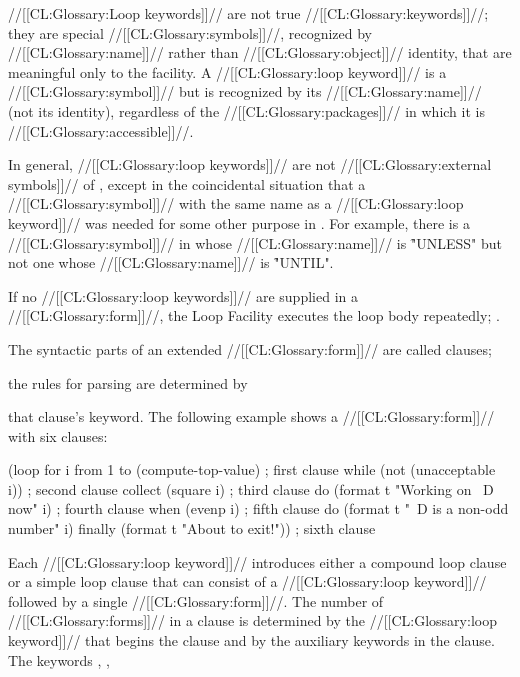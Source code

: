\endsubsubsubsection%

\endsubsubsection%



//[[CL:Glossary:Loop keywords]]// are not true //[[CL:Glossary:keywords]]//; 
they are special //[[CL:Glossary:symbols]]//, recognized by //[[CL:Glossary:name]]// rather than //[[CL:Glossary:object]]// identity,
that are meaningful only to the  facility.
A //[[CL:Glossary:loop keyword]]// is a //[[CL:Glossary:symbol]]// but is recognized by its //[[CL:Glossary:name]]//
(not its identity), regardless of the //[[CL:Glossary:packages]]// in which it is //[[CL:Glossary:accessible]]//.  

In general, //[[CL:Glossary:loop keywords]]// are not //[[CL:Glossary:external symbols]]// of ,
except in the coincidental situation that a //[[CL:Glossary:symbol]]// with the same name as a
//[[CL:Glossary:loop keyword]]// was needed for some other purpose in \clisp.  For example,
there is a //[[CL:Glossary:symbol]]// in  whose //[[CL:Glossary:name]]// is \f{"UNLESS"} but
not one whose //[[CL:Glossary:name]]// is \f{"UNTIL"}.


If no //[[CL:Glossary:loop keywords]]// are supplied in a  //[[CL:Glossary:form]]//,
the Loop Facility executes the loop body repeatedly; \seesection\SimpleLoop.

\endsubsubsection%

 

The syntactic parts of an extended  //[[CL:Glossary:form]]// are called clauses; 


the rules for parsing are determined by 

that clause's keyword.
The following example shows a  //[[CL:Glossary:form]]// with six clauses:
 
\code
 (loop for i from 1 to (compute-top-value)       ; first clause
       while (not (unacceptable i))              ; second clause
       collect (square i)                        ; third clause
       do (format t "Working on ~D now" i)       ; fourth clause
       when (evenp i)                            ; fifth clause
         do (format t "~D is a non-odd number" i)
       finally (format t "About to exit!"))      ; sixth clause
\endcode
 

Each //[[CL:Glossary:loop keyword]]// introduces 
either a compound loop clause or a simple loop clause
that can consist of a //[[CL:Glossary:loop keyword]]// followed by a single //[[CL:Glossary:form]]//.
The number of //[[CL:Glossary:forms]]// in a clause is determined by the //[[CL:Glossary:loop keyword]]// 
that begins the clause and by the auxiliary keywords in the clause.
The keywords , 
,

